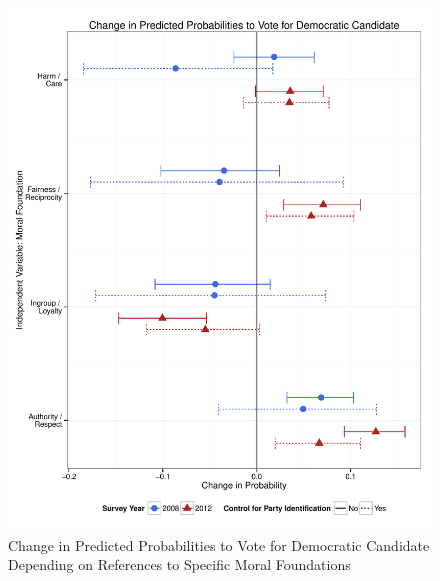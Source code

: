 \documentclass[12pt]{article}
\begin{document}
\begin{figure}\centering
\includegraphics[scale=.4]{../calc/fig/m2_vote.pdf}
\caption{Change in Predicted Probabilities to Vote for Democratic Candidate Depending on References to Specific Moral Foundations}\label{fig:m2_vote}
\end{figure}
\end{document}
